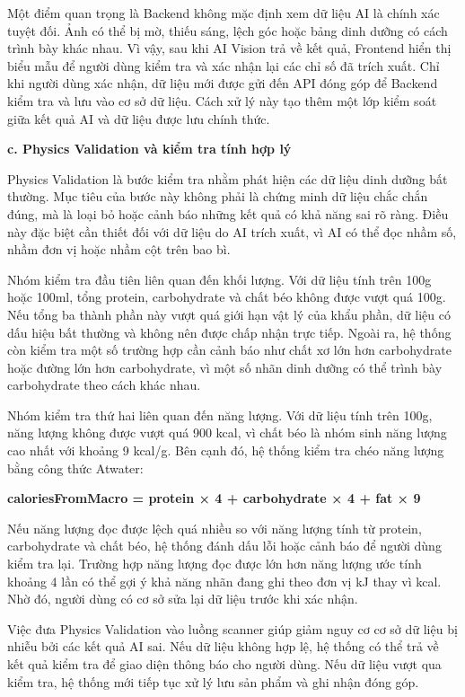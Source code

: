 \documentclass[12pt, a4paper]{report}
\begin{document}
Một điểm quan trọng là Backend không mặc định xem dữ liệu AI là chính xác tuyệt đối. Ảnh có thể bị mờ, thiếu sáng, lệch góc hoặc bảng dinh dưỡng có cách trình bày khác nhau. Vì vậy, sau khi AI Vision trả về kết quả, Frontend hiển thị biểu mẫu để người dùng kiểm tra và xác nhận lại các chỉ số đã trích xuất. Chỉ khi người dùng xác nhận, dữ liệu mới được gửi đến API đóng góp để Backend kiểm tra và lưu vào cơ sở dữ liệu. Cách xử lý này tạo thêm một lớp kiểm soát giữa kết quả AI và dữ liệu được lưu chính thức.

\textbf{c. Physics Validation và kiểm tra tính hợp lý}

Physics Validation là bước kiểm tra nhằm phát hiện các dữ liệu dinh dưỡng bất thường. Mục tiêu của bước này không phải là chứng minh dữ liệu chắc chắn đúng, mà là loại bỏ hoặc cảnh báo những kết quả có khả năng sai rõ ràng. Điều này đặc biệt cần thiết đối với dữ liệu do AI trích xuất, vì AI có thể đọc nhầm số, nhầm đơn vị hoặc nhầm cột trên bao bì.

Nhóm kiểm tra đầu tiên liên quan đến khối lượng. Với dữ liệu tính trên 100g hoặc 100ml, tổng protein, carbohydrate và chất béo không được vượt quá 100g. Nếu tổng ba thành phần này vượt quá giới hạn vật lý của khẩu phần, dữ liệu có dấu hiệu bất thường và không nên được chấp nhận trực tiếp. Ngoài ra, hệ thống còn kiểm tra một số trường hợp cần cảnh báo như chất xơ lớn hơn carbohydrate hoặc đường lớn hơn carbohydrate, vì một số nhãn dinh dưỡng có thể trình bày carbohydrate theo cách khác nhau.

Nhóm kiểm tra thứ hai liên quan đến năng lượng. Với dữ liệu tính trên 100g, năng lượng không được vượt quá 900 kcal, vì chất béo là nhóm sinh năng lượng cao nhất với khoảng 9 kcal/g. Bên cạnh đó, hệ thống kiểm tra chéo năng lượng bằng công thức Atwater:

\textbf{caloriesFromMacro = protein × 4 + carbohydrate × 4 + fat × 9}

Nếu năng lượng đọc được lệch quá nhiều so với năng lượng tính từ protein, carbohydrate và chất béo, hệ thống đánh dấu lỗi hoặc cảnh báo để người dùng kiểm tra lại. Trường hợp năng lượng đọc được lớn hơn năng lượng ước tính khoảng 4 lần có thể gợi ý khả năng nhãn đang ghi theo đơn vị kJ thay vì kcal. Nhờ đó, người dùng có cơ sở sửa lại dữ liệu trước khi xác nhận.

Việc đưa Physics Validation vào luồng scanner giúp giảm nguy cơ cơ sở dữ liệu bị nhiễu bởi các kết quả AI sai. Nếu dữ liệu không hợp lệ, hệ thống có thể trả về kết quả kiểm tra để giao diện thông báo cho người dùng. Nếu dữ liệu vượt qua kiểm tra, hệ thống mới tiếp tục xử lý lưu sản phẩm và ghi nhận đóng góp.
\end{document}
